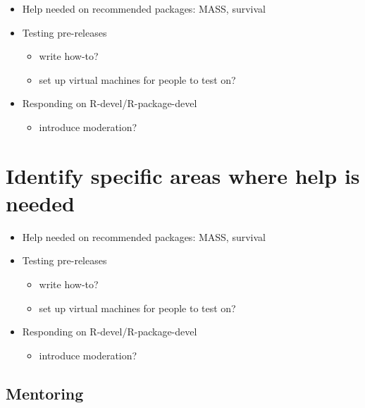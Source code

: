 \documentclass[]{book}
\providecommand{\tightlist}{%
  \setlength{\itemsep}{0pt}\setlength{\parskip}{0pt}}
\begin{document}
\begin{itemize}
\tightlist
\item
  Help needed on recommended packages: MASS, survival
\item
  Testing pre-releases

  \begin{itemize}
  \tightlist
  \item
    write how-to?
  \item
    set up virtual machines for people to test on?
  \end{itemize}
\item
  Responding on R-devel/R-package-devel

  \begin{itemize}
  \tightlist
  \item
    introduce moderation?
  \end{itemize}
\end{itemize}

\hypertarget{identify-specific-areas-where-help-is-needed-1}{%
\chapter{Identify specific areas where help is needed}\label{identify-specific-areas-where-help-is-needed-1}}

\begin{itemize}
\tightlist
\item
  Help needed on recommended packages: MASS, survival
\item
  Testing pre-releases

  \begin{itemize}
  \tightlist
  \item
    write how-to?
  \item
    set up virtual machines for people to test on?
  \end{itemize}
\item
  Responding on R-devel/R-package-devel

  \begin{itemize}
  \tightlist
  \item
    introduce moderation?
  \end{itemize}
\end{itemize}

\hypertarget{mentoring}{%
\section{Mentoring}\label{mentoring}}
\end{document}
